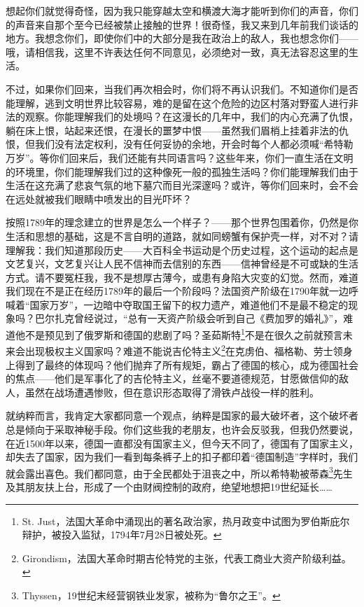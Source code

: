 \documentclass[UTF8]{ctexart}
\begin{document}
想起你们就觉得奇怪，因为我只能穿越太空和横渡大海才能听到你们的声音，你们的声音来自那个至今已经被禁止接触的世界！很奇怪，我又来到几年前我们谈话的地方。我想念你们，即使你们中的大部分是我在政治上的敌人，我也想念你们——哦，请相信我，这里不许表达任何不同意见，必须绝对一致，真无法容忍这里的生活。

不过，如果你们回来，当我们再次相会时，你们将不再认识我们。不知道你们是否能理解，逃到文明世界比较容易，难的是留在这个危险的边区村落对野蛮人进行非法的观察。你能理解我们的处境吗？在这漫长的几年中，我们的内心充满了仇恨，躺在床上恨，站起来还恨，在漫长的噩梦中恨——虽然我们眉梢上挂着非法的仇恨，但我们没有法定权利，没有任何妥协的余地，开会时每个人都必须喊“希特勒万岁”。等你们回来后，我们还能有共同语言吗？这些年来，你们一直生活在文明的环境里，你们能理解我们过的这种像死一般的孤独生活吗？你们能理解我们由于生活在这充满了悲哀气氛的地下墓穴而目光深邃吗？或许，等你们回来时，会不会在远处就被我们眼睛中喷发出的目光吓坏？

按照1789年的理念建立的世界是怎么一个样子？——那个世界包围着你，仍然是你生活和思想的基础，这是不言自明的道路，就如同螃蟹有保护壳一样，对不对？请理解我：我们知道那段历史——大百科全书运动是个历史过程，这个运动的起点是文艺复兴，文艺复兴让人民不信神而去信别的东西——信神曾经是不可或缺的生活方式。请不要冤枉我，我不是想厚古薄今，或患有身陷大灾变的幻觉。然而，难道我们现在不是正在经历1789年的最后一个阶段吗？法国资产阶级在1790年就一边呼喊着“国家万岁”，一边暗中夺取国王留下的权力遗产，难道他们不是最不稳定的现象吗？巴尔扎克曾经说过，“总有一天资产阶级会听到自己《费加罗的婚礼》”，难道他不是预见到了俄罗斯和德国的悲剧了吗？圣茹斯特\footnote{St. Just，法国大革命中涌现出的著名政治家，热月政变中试图为罗伯斯庇尔辩护，被投入监狱，1794年7月28日被处死。}不是在很久之前就预言未来会出现极权主义国家吗？难道不能说吉伦特主义\footnote{Girondism，法国大革命时期吉伦特党的主张，代表工商业大资产阶级利益。}在克虏伯、福格勒、劳士领身上得到了最终的体现吗？他们抛弃了所有规矩，霸占了德国的核心，成为德国社会的焦点——他们是军事化了的吉伦特主义，丝毫不要道德规范，甘愿做信仰的敌人，虽然在战场遭遇惨败，但在意识形态取得了滑铁卢战役一样的胜利。

就纳粹而言，我肯定大家都同意一个观点，纳粹是国家的最大破坏者，这个破坏者总是倾向于采取神秘手段。你们这些我的老朋友，也许会反驳我，但我仍然要说，在近1500年以来，德国一直都没有国家主义，但今天不同了，德国有了国家主义，却失去了国家，因为我们一看到每条裤子上的扣子都印着“德国制造”字样时，我们就会露出喜色。我们都同意，由于全民都处于沮丧之中，所以希特勒被蒂森\footnote{Thyssen，19世纪末经营钢铁业发家，被称为“鲁尔之王”。}先生及其朋友扶上台，形成了一个由财阀控制的政府，绝望地想把19世纪延长……
\end{document}

